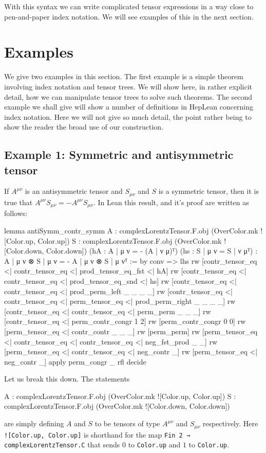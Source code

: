 \documentclass[a4paper, 11pt]{article}
\begin{document}
With this syntax we can write complicated tensor expressions in a way close to pen-and-paper index notation. 
We will see examples of this in the next section.

\section{Examples} \label{sec:examples}

We give two examples in this section. The first example is a simple theorem involving index notation and 
tensor trees. We will show here, in rather explicit detail, how we can manipulate tensor trees to solve 
such theorems. 
The second example we shall give will show a number of definitions in HepLean concerning index notation.
Here we will not give so much detail, the point rather being to show the reader the broad use of our 
construction. 

\subsection{Example 1: Symmetric and antisymmetric tensor} \label{sec:exampleSymmAntiSymm}
If $A^{\mu \nu}$ is an antisymmetric tensor and $S_{\mu \nu}$ and $S$ is a symmetric tensor, then
it is true that $A^{\mu \nu} S_{\mu \nu} = - A^{\mu \nu} S_{\mu \nu}$. In Lean this result, and 
it's proof are written as follows: 
\begin{code}
lemma antiSymm_contr_symm 
    {A : complexLorentzTensor.F.obj (OverColor.mk ![Color.up, Color.up])}
    {S : complexLorentzTensor.F.obj (OverColor.mk ![Color.down, Color.down])}
    (hA : {A | μ ν = - (A | ν μ)}ᵀ) (hs : {S | μ ν = S | ν μ}ᵀ) :
    {A | μ ν ⊗ S | μ ν = - A | μ ν ⊗ S | μ ν}ᵀ := by
  conv =>
    lhs
    rw [contr_tensor_eq <| contr_tensor_eq <| prod_tensor_eq_fst <| hA]
    rw [contr_tensor_eq <| contr_tensor_eq <| prod_tensor_eq_snd <| hs]
    rw [contr_tensor_eq <| contr_tensor_eq <| prod_perm_left _ _ _ _]
    rw [contr_tensor_eq <| contr_tensor_eq <| perm_tensor_eq <| prod_perm_right _ _ _ _]
    rw [contr_tensor_eq <| contr_tensor_eq <| perm_perm _ _ _]
    rw [contr_tensor_eq <| perm_contr_congr 1 2]
    rw [perm_contr_congr 0 0]
    rw [perm_tensor_eq <| contr_contr _ _ _]
    rw [perm_perm]
    rw [perm_tensor_eq <| contr_tensor_eq <| contr_tensor_eq <| neg_fst_prod _ _]
    rw [perm_tensor_eq <| contr_tensor_eq <| neg_contr _]
    rw [perm_tensor_eq <| neg_contr _]
  apply perm_congr _ rfl
  decide
\end{code}
Let us break this down. The statements 
\begin{code} 
{A : complexLorentzTensor.F.obj (OverColor.mk ![Color.up, Color.up])}
{S : complexLorentzTensor.F.obj (OverColor.mk ![Color.down, Color.down])}
\end{code}
are simply defining $A$ and $S$ to be tensors of type $A^{\mu \nu}$ and $S_{\mu \nu}$ respectively.
Here \lstinline|![Color.up, Color.up]| is shorthand for the map \lstinline|Fin 2 → complexLorentzTensor.C| that sends
$0$ to \lstinline|Color.up| and $1$ to \lstinline|Color.up|.
\end{document}
